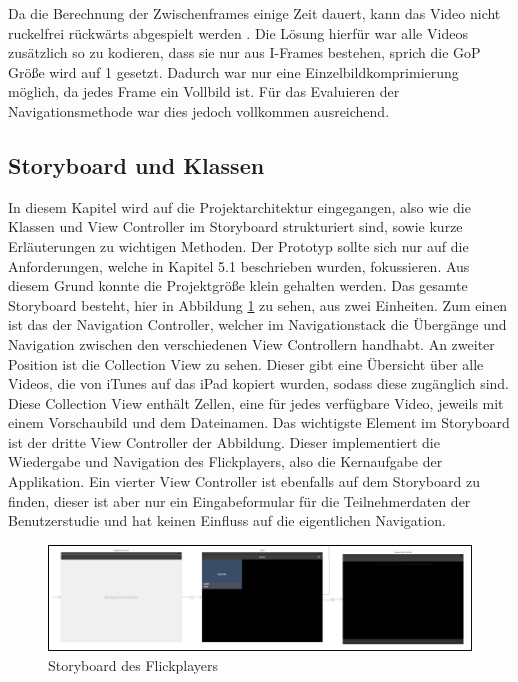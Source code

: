 \documentclass[11pt,a4paper]{report}
\begin{document}
Da die Berechnung der Zwischenframes einige Zeit dauert, kann das Video nicht ruckelfrei rückwärts abgespielt werden \cite{le1991mpeg}. Die Lösung hierfür war alle Videos zusätzlich so zu kodieren, dass sie nur aus I-Frames bestehen, sprich die GoP Größe wird auf 1 gesetzt. Dadurch war nur eine Einzelbildkomprimierung möglich, da jedes Frame ein Vollbild ist. Für das Evaluieren der Navigationsmethode war dies jedoch vollkommen ausreichend.

\subsection{Storyboard und Klassen}

In diesem Kapitel wird auf die Projektarchitektur eingegangen, also wie die Klassen und View Controller im Storyboard strukturiert sind, sowie kurze Erläuterungen zu wichtigen Methoden. Der Prototyp sollte sich nur auf die Anforderungen, welche in Kapitel 5.1 beschrieben wurden, fokussieren. Aus diesem Grund konnte die Projektgröße klein gehalten werden. Das gesamte Storyboard besteht, hier in Abbildung \ref{storyboard_flickplayer} zu sehen, aus zwei Einheiten. Zum einen ist das der Navigation Controller, welcher im Navigationstack die Übergänge und Navigation zwischen den verschiedenen View Controllern handhabt. An zweiter Position ist die Collection View zu sehen. Dieser gibt eine Übersicht über alle Videos, die von iTunes auf das iPad kopiert wurden, sodass diese zugänglich sind. Diese Collection View enthält Zellen, eine für jedes verfügbare Video, jeweils mit einem Vorschaubild und dem Dateinamen. Das wichtigste Element im Storyboard ist der dritte View Controller der Abbildung. Dieser implementiert die Wiedergabe und Navigation des Flickplayers, also die Kernaufgabe der Applikation. Ein vierter View Controller ist ebenfalls auf dem Storyboard zu finden, dieser ist aber nur ein Eingabeformular für die Teilnehmerdaten der Benutzerstudie und hat keinen Einfluss auf die eigentlichen Navigation.
\begin{figure}[h]
\begin{center}
\includegraphics[scale=1]{./images/26.png}
\caption{Storyboard des Flickplayers}
\label{storyboard_flickplayer}
\end{center}
\end{figure}
\end{document}
